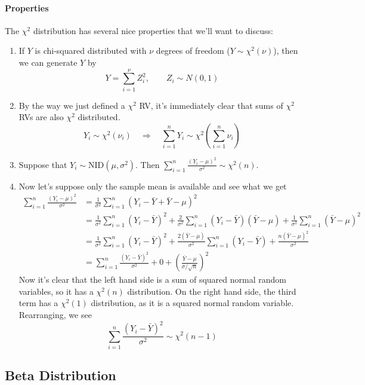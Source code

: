 \documentclass[12pt]{article}
\theoremstyle{plain}
\theoremstyle{definition}
\theoremstyle{remark}
\begin{document}
\paragraph{Properties}
The $\chi^2$ distribution has several nice properties that we'll
want to discuss:
\begin{enumerate}
   \item If $Y$ is chi-squared distributed with $\nu$ degrees of
      freedom ($Y\sim \chi^2(\nu)$), then we can generate $Y$ by
	 \[ Y = \sum^\nu_{i=1} Z^2_i, \qquad
	    Z_i \sim N(0,1)\]
   \item By the way we just defined a $\chi^2$ RV, it's immediately
      clear that sums of $\chi^2$ RVs are also $\chi^2$ distributed.
	 \[ Y_i \sim \chi^2(\nu_i) \quad \Rightarrow \quad
	    \sum^n_{i=1} Y_i \sim \chi^2\left(\sum^n_{i=1} \nu_i \right)
	    \]
   \item Suppose that $Y_i \sim \text{NID}(\mu,\sigma^2)$. Then
       $\sum^n_{i=1} \frac{(Y_i-\mu)^2}{\sigma^2}  \sim \chi^2(n)$.
   \item Now let's suppose only the sample mean is available and
      see what we get
      \begin{align*}
	 \sum^n_{i=1} \frac{(Y_i-\mu)^2}{\sigma^2} &= \frac{1}{
	    \sigma^2} \sum^n_{i=1} (Y_i - \bar{Y}+ \bar{Y}-\mu)^2 \\
	    &= \frac{1}{\sigma^2} \sum^n_{i=1}  (Y_i - \bar{Y})^2
	    + \frac{2}{\sigma^2} \sum^n_{i=1} (Y_i-\bar{Y})(\bar{Y}-\mu)
	    + \frac{1}{\sigma^2} \sum^n_{i=1} (\bar{Y}-\mu)^2 \\
	    &= \frac{1}{\sigma^2} \sum^n_{i=1}  (Y_i - \bar{Y})^2
	    + \frac{2(\bar{Y}-\mu)}{\sigma^2} \sum^n_{i=1} (Y_i-\bar{Y})
	    + \frac{n(\bar{Y}-\mu)^2 }{\sigma^2}  \\
	 &= \sum^n_{i=1}\frac{(Y_i - \bar{Y})^2 }{\sigma^2} + 0 +
	    \left(\frac{\bar{Y}-\mu }{\sigma /\sqrt{n}}\right)^2
      \end{align*}
      Now it's clear that the left hand side is a sum of squared normal
      random variables, so it has a $\chi^2(n)$ distribution. On
      the right hand side, the third term has a $\chi^2(1)$
      distribution, as it is a squared normal random variable.
      Rearranging, we see
      \[ \sum^n_{i=1}\frac{(Y_i - \bar{Y})^2 }{\sigma^2}  \sim
	    \chi^2(n-1) \]
\end{enumerate}

\subsection{Beta Distribution}
\end{document}
